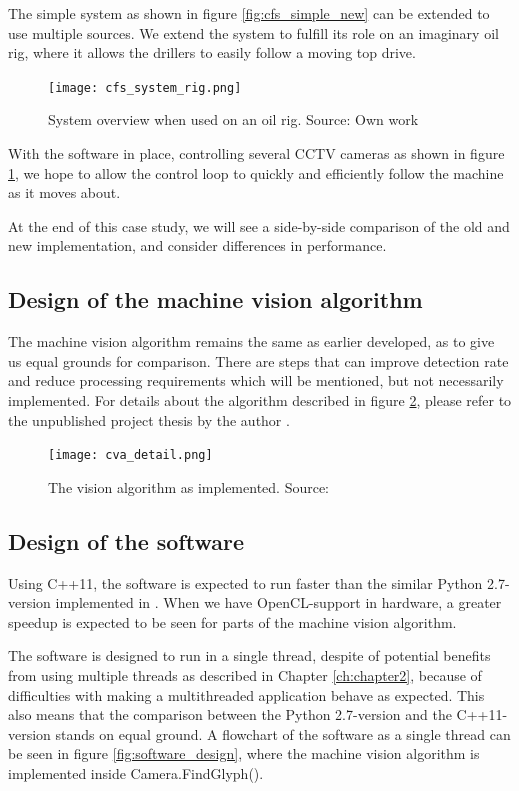 The simple system as shown in figure \ref{fig:cfs_simple_new} can be extended to use multiple sources. We extend the system to fulfill its role on an imaginary oil rig, where it allows the drillers to easily follow a moving top drive.

\begin{figure}[ht]
    \centering
    \texttt{[image: cfs\_system\_rig.png]}
    \caption{System overview when used on an oil rig. Source: Own work}
    \label{fig:cfs_system_rig}
\end{figure}
\FloatBarrier

With the software in place, controlling several CCTV cameras as shown in figure \ref{fig:cfs_system_rig}, we hope to allow the control loop to quickly and efficiently follow the machine as it moves about. 

At the end of this case study, we will see a side-by-side comparison of the old and new implementation, and consider differences in performance.

\subsection{Design of the machine vision algorithm}
The machine vision algorithm remains the same as earlier developed, as to give us equal grounds for comparison. There are steps that can improve detection rate and reduce processing requirements which will be mentioned, but not necessarily implemented. For details about the algorithm described in figure \ref{fig:cva_detail}, please refer to the unpublished project thesis by the author \citep{joakimsk14}.

\begin{figure}[ht]
    \centering
    \texttt{[image: cva\_detail.png]}
    \caption{The vision algorithm as implemented. Source:\citet{joakimsk14}}
    \label{fig:cva_detail}
\end{figure}
\FloatBarrier

\subsection{Design of the software}
Using C++11, the software is expected to run faster than the similar Python 2.7-version implemented in \citet{joakimsk14}. When we have OpenCL-support in hardware, a greater speedup is expected to be seen for parts of the machine vision algorithm.

The software is designed to run in a single thread, despite of potential benefits from using multiple threads as described in Chapter \ref{ch:chapter2}, because of difficulties with making a multithreaded application behave as expected. This also means that the comparison between the Python 2.7-version and the C++11-version stands on equal ground. A flowchart of the software as a single thread can be seen in figure \ref{fig:software_design}, where the machine vision algorithm is implemented inside Camera.FindGlyph().

